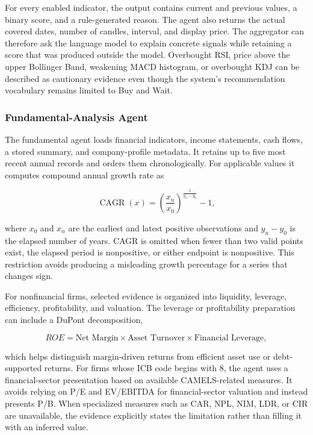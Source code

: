 For every enabled indicator, the output contains current and previous values, a binary score, and a rule-generated reason. The agent also returns the actual covered dates, number of candles, interval, and display price. The aggregator can therefore ask the language model to explain concrete signals while retaining a score that was produced outside the model. Overbought RSI, price above the upper Bollinger Band, weakening MACD histogram, or overbought KDJ can be described as cautionary evidence even though the system's recommendation vocabulary remains limited to Buy and Wait.

\subsubsection{Fundamental-Analysis Agent}
\label{subsubsec:fundamental-analysis-agent}

The fundamental agent loads financial indicators, income statements, cash flows, a stored summary, and company-profile metadata. It retains up to five most recent annual records and orders them chronologically. For applicable values it computes compound annual growth rate as

\begin{equation}
    \operatorname{CAGR}(x) = \left(\frac{x_{n}}{x_{0}}\right)^{\frac{1}{y_{n}-y_{0}}} - 1,
    \label{eq:fundamental-cagr}
\end{equation}

where $x_{0}$ and $x_{n}$ are the earliest and latest positive observations and $y_{n}-y_{0}$ is the elapsed number of years. CAGR is omitted when fewer than two valid points exist, the elapsed period is nonpositive, or either endpoint is nonpositive. This restriction avoids producing a misleading growth percentage for a series that changes sign.

For nonfinancial firms, selected evidence is organized into liquidity, leverage, efficiency, profitability, and valuation. The leverage or profitability preparation can include a DuPont decomposition,

\begin{equation}
    ROE = \text{Net Margin} \times \text{Asset Turnover} \times \text{Financial Leverage},
    \label{eq:dupont-stockrium}
\end{equation}

which helps distinguish margin-driven returns from efficient asset use or debt-supported returns. For firms whose ICB code begins with 8, the agent uses a financial-sector presentation based on available CAMELS-related measures. It avoids relying on P/E and EV/EBITDA for financial-sector valuation and instead presents P/B. When specialized measures such as CAR, NPL, NIM, LDR, or CIR are unavailable, the evidence explicitly states the limitation rather than filling it with an inferred value.

